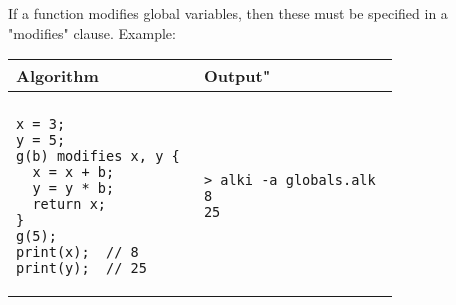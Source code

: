 \documentclass[a4paper]{report}
\begin{document}
If a function modifies global variables, then these must be specified in a "modifies" clause.
Example:
\begin{center}
\begin{tabular}{ll}
Algorithm & Output"\\
\hline
\\
\begin{minipage}{.55\textwidth}
\begin{verbatim}
x = 3;
y = 5;
g(b) modifies x, y { 
  x = x + b;
  y = y * b;
  return x;
}
g(5);
print(x);  // 8
print(y);  // 25
\end{verbatim}
\end{minipage}
&
\begin{minipage}{.42\textwidth}
\begin{verbatim}
> alki -a globals.alk 
8
25
\end{verbatim}
\end{minipage}
\end{tabular}
\end{center}
\end{document}
